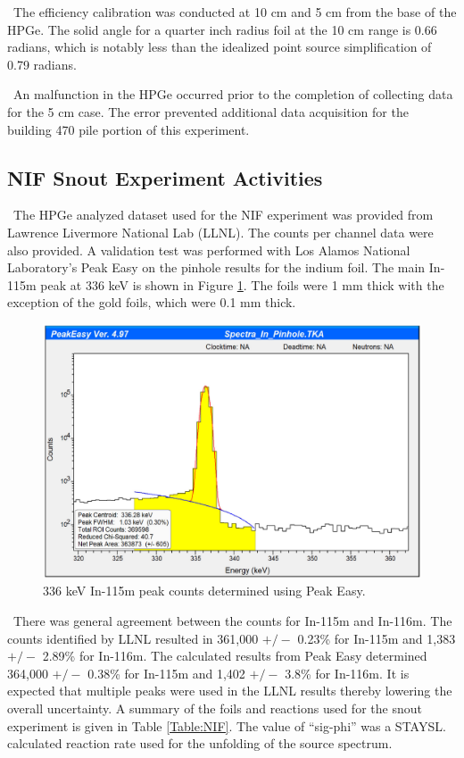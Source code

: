 \documentclass[journal]{IEEEtran}
\let\MYoriglatexcaption\caption
\renewcommand{\caption}[2][\relax]{\MYoriglatexcaption[#2]{#2}}
\begin{document}
{	\ The efficiency calibration was conducted at 10 cm and 5 cm from the base of the HPGe. 
The solid angle for a quarter inch radius foil at the 10 cm range is 0.66 radians, which is notably less than the idealized point source simplification of 0.79 radians. 
	
	\ An malfunction in the HPGe occurred prior to the completion of collecting data for the 5 cm case. 
The error prevented additional data acquisition for the building 470 pile portion of this experiment.
	
	\subsection{NIF Snout Experiment Activities}
	  
	\ The HPGe analyzed dataset used for the NIF experiment was provided from Lawrence Livermore National Lab (LLNL). 
The counts per channel data were also provided. 
A validation test was performed with Los Alamos National Laboratory's Peak Easy on the pinhole results for the indium foil. %
The main In-115m peak at 336 keV is shown in Figure \ref{fig:peakez}. 
The foils were 1 mm thick with the exception of the gold foils, which were 0.1 mm thick. 
	
	\begin{figure}[h]
		\includegraphics[width=\linewidth]{Figures/PeakEZ.png}
		\caption{336 keV In-115m peak counts determined using Peak Easy.}
		\label{fig:peakez}
	\end{figure}
	\ There was general agreement between the counts for In-115m and In-116m. 
The counts identified by LLNL resulted in 361,000 $+/-$ 0.23\% for In-115m and 1,383 $+/-$ 2.89\% for In-116m. 
The calculated results from Peak Easy determined 364,000 $+/-$ 0.38\% for In-115m and 1,402 $+/-$ 3.8\% for In-116m. 
It is expected that multiple peaks were used in the LLNL results thereby lowering the overall uncertainty.
A summary of the foils and reactions used for the snout experiment is given in Table \ref{Table:NIF}. The value of ``sig-phi'' was a STAYSL. calculated reaction rate used for the unfolding of the source spectrum.
	
}
\end{document}
